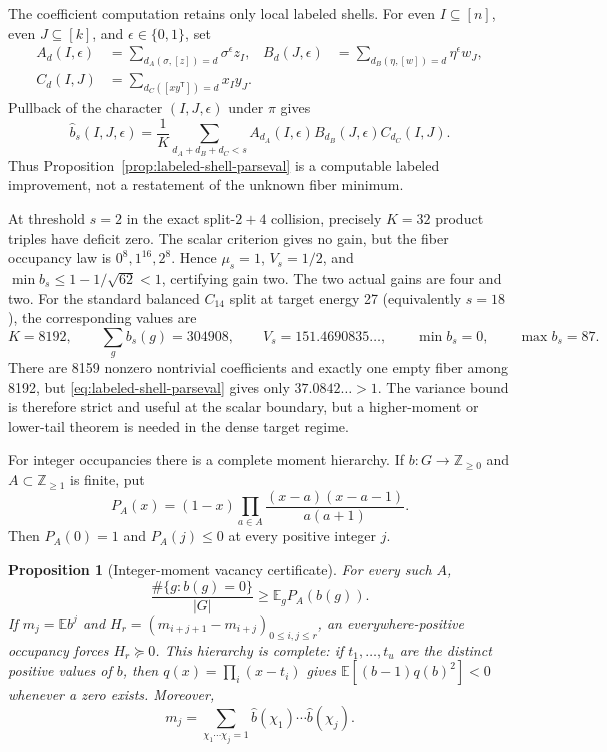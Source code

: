 \documentclass[11pt]{article}
\newtheorem{proposition}[theorem]{Proposition}
\newcommand{\E}{\mathbb E}
\begin{document}
The coefficient computation retains only local labeled shells.  For even
$I\subseteq[n]$, even $J\subseteq[k]$, and $\epsilon\in\{0,1\}$, set
\begin{align*}
 A_d(I,\epsilon)&=\sum_{d_A(\sigma,[z])=d}\sigma^\epsilon z_I,&
 B_d(J,\epsilon)&=\sum_{d_B(\eta,[w])=d}\eta^\epsilon w_J,\\
 C_d(I,J)&=\sum_{d_C([xy^{\mathsf T}])=d}x_Iy_J.
\end{align*}
Pullback of the character $(I,J,\epsilon)$ under $\pi$ gives
\begin{equation}
 \widehat b_s(I,J,\epsilon)=\frac1K
 \sum_{d_A+d_B+d_C<s}
 A_{d_A}(I,\epsilon)B_{d_B}(J,\epsilon)C_{d_C}(I,J).
 \label{eq:labeled-shell-factorization}
\end{equation}
Thus Proposition~\ref{prop:labeled-shell-parseval} is a computable labeled
improvement, not a restatement of the unknown fiber minimum.

At threshold $s=2$ in the exact split-$2+4$ collision, precisely $K=32$
product triples have deficit zero.  The scalar criterion gives no gain, but
the fiber occupancy law is $0^8,1^{16},2^8$.  Hence
$\mu_s=1$, $V_s=1/2$, and
$\min b_s\le1-1/\sqrt{62}<1$, certifying gain two.  The two actual gains are
four and two.  For the standard balanced $C_{14}$ split at target energy 27
(equivalently $s=18$),
the corresponding values are
\[
 K=8192,\qquad \sum_g b_s(g)=304908,\qquad
 V_s=151.4690835\ldots,\qquad \min b_s=0,\qquad\max b_s=87.
\]
There are 8159 nonzero nontrivial coefficients and exactly one empty fiber
among 8192, but
\eqref{eq:labeled-shell-parseval} gives only $37.0842\ldots>1$.  The variance
bound is therefore strict and useful at the scalar boundary, but a
higher-moment or lower-tail theorem is needed in the dense target regime.

For integer occupancies there is a complete moment hierarchy.  If
$b:G\to\mathbb Z_{\ge0}$ and $A\subset\mathbb Z_{\ge1}$ is finite, put
\[
 P_A(x)=(1-x)\prod_{a\in A}
 \frac{(x-a)(x-a-1)}{a(a+1)}.
\]
Then $P_A(0)=1$ and $P_A(j)\le0$ at every positive integer $j$.

\begin{proposition}[Integer-moment vacancy certificate]
\label{prop:labeled-shell-moments}
For every such $A$,
\begin{equation}
 \frac{\#\{g:b(g)=0\}}{|G|}\ge\E_gP_A(b(g)).
 \label{eq:labeled-shell-moment-certificate}
\end{equation}
If $m_j=\E b^j$ and
$H_r=(m_{i+j+1}-m_{i+j})_{0\le i,j\le r}$, an everywhere-positive
occupancy forces $H_r\succeq0$.  This hierarchy is complete: if
$t_1,\ldots,t_u$ are the distinct positive values of $b$, then
$q(x)=\prod_i(x-t_i)$ gives
$\E[(b-1)q(b)^2]<0$ whenever a zero exists.  Moreover,
\begin{equation}
 m_j=\sum_{\chi_1\cdots\chi_j=1}
 \widehat b(\chi_1)\cdots\widehat b(\chi_j).
 \label{eq:labeled-shell-moments-fourier}
\end{equation}
\end{proposition}
\end{document}
